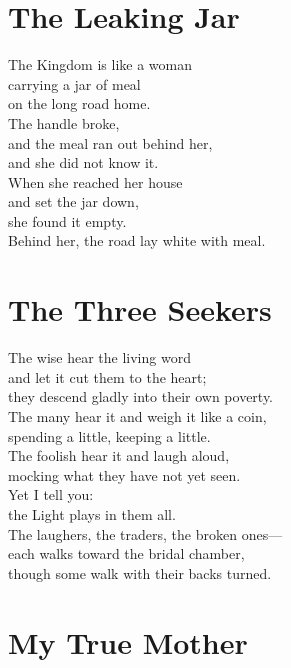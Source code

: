 \documentclass[10pt, openright]{book}
\newcommand{\sectionbreak}{\filbreak}
\newcommand{\sayingsource}[1]{\par\nopagebreak\vspace{0.3\baselineskip}{\raggedleft\footnotesize\itshape #1\par}}
\begin{document}
\sayingsource{Tao Te Ching 39}

\sectionbreak

\section{The Leaking Jar}\label{the-leaking-jar}

The Kingdom is like a woman\\
carrying a jar of meal\\
on the long road home.\\
The handle broke,\\
and the meal ran out behind her,\\
and she did not know it.\\
When she reached her house\\
and set the jar down,\\
she found it empty.\\
Behind her, the road lay white with meal.

\sayingsource{Tao Te Ching 40 · Thomas 97}

\sectionbreak

\section{The Three Seekers}\label{the-three-seekers}

The wise hear the living word\\
and let it cut them to the heart;\\
they descend gladly into their own poverty.\\
The many hear it and weigh it like a coin,\\
spending a little, keeping a little.\\
The foolish hear it and laugh aloud,\\
mocking what they have not yet seen.\\
Yet I tell you:\\
the Light plays in them all.\\
The laughers, the traders, the broken ones---\\
each walks toward the bridal chamber,\\
though some walk with their backs turned.

\sayingsource{Tao Te Ching 41 · Matthew 13:3--9}

\sectionbreak

\section{My True Mother}\label{my-true-mother}
\end{document}
